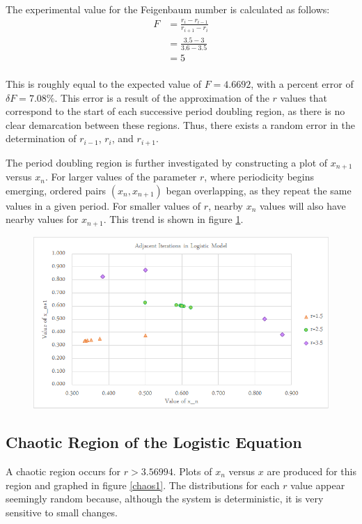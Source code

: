 \documentclass[a4paper]{article}
\begin{document}
The experimental value for the Feigenbaum number is calculated as follows:
\begin{align*}
F
&= \frac{r_i - r_{i-1}}{r_{i+1} - r_i} \\
&= \frac{3.5-3}{3.6-3.5} \\
&= 5 \\
\end{align*}

This is roughly equal to the expected value of $F=4.6692$, with a percent error of $\delta F = 7.08 \%$. This error is a result of the approximation of the $r$ values that correspond to the start of each successive period doubling region, as there is no clear demarcation between these regions. Thus, there exists a random error in the determination of $r_{i-1}$, $r_i$, and $r_{i+1}$.

The period doubling region is further investigated by constructing a plot of $x_{n+1}$ versus $x_n$. For larger values of the parameter $r$, where periodicity begins emerging, ordered pairs $( x_n , x_{n+1} )$ began overlapping, as they repeat the same values in a given period. For smaller values of $r$, nearby $x_n$ values will also have nearby values for $x_{n+1}$. This trend is shown in figure \ref{pdoub1_n1vn}.

\begin{figure}[H]
\centering
\includegraphics[width=1\textwidth]{pdoub_n1vn.png}
\label{pdoub1_n1vn}
\end{figure}

\subsection{Chaotic Region of the Logistic Equation}
\qq A chaotic region occurs for $r>3.56994$. Plots of $x_n$ versus $x$ are produced for this region and graphed in figure \ref{chaos1}. The distributions for each $r$ value appear seemingly random because, although the system is deterministic, it is very sensitive to small changes.
\end{document}
